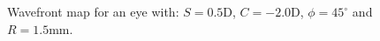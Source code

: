 \begin{figure}[htb]
	\centering
	
	 
	\caption[Example of a normalized Wavefront map]{Wavefront map for an eye with: $S = 0.5$D, $C = -2.0$D, $\phi = 45^\circ$ and $R = 1.5$mm.} 
	\label{fig:wavefront} 
\end{figure}